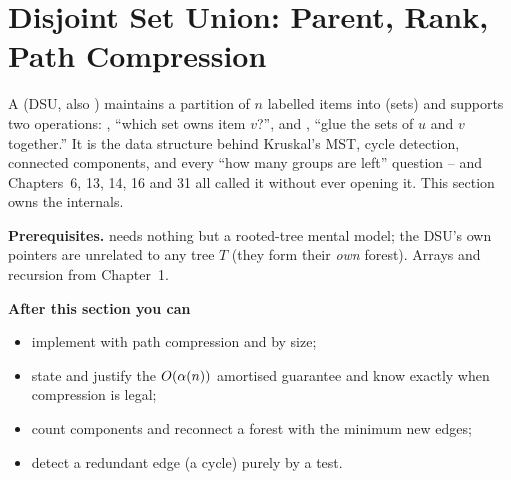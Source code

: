 \section{Disjoint Set Union: Parent, Rank, Path Compression}\label{sec:c28-dsu}

\begin{topicintro}
A  (DSU, also ) maintains a
partition of \(n\) labelled items into  (sets) and supports
two operations: , ``which set owns item \(v\)?'', and ,
``glue the sets of \(u\) and \(v\) together.''  It is the data structure
behind Kruskal's MST, cycle detection, connected components, and every
``how many groups are left'' question -- and Chapters~6, 13, 14, 16 and 31
all called it without ever opening it.  This section owns the internals.

\textbf{Prerequisites.}  needs nothing but a rooted-tree
mental model; the DSU's own  pointers are unrelated to any tree
\(T\) (they form their \emph{own} forest).  Arrays and recursion from
Chapter~1.

\textbf{After this section you can}
\begin{itemize}[nosep]
  \item implement  with path compression and  by size; \hfill{}
  \item state and justify the \(O(\alpha(n))\) amortised guarantee and
        know exactly when compression is legal; \hfill{}
  \item count components and reconnect a forest with the minimum new edges; \hfill{}
  \item detect a redundant edge (a cycle) purely by a  test. \hfill{}
\end{itemize}
\end{topicintro}

